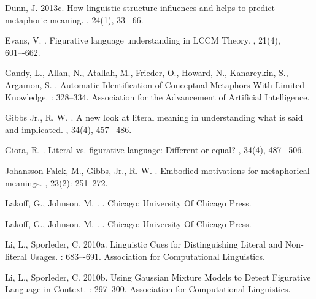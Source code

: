 \documentclass[11pt]{article}
\begin{document}
\begin{thebibliography}{}
Dunn, J. 
\newblock 2013c.
\newblock How linguistic structure influences and helps to predict metaphoric meaning.
, 24(1), 33–-66.

Evans, V.
.
\newblock Figurative language understanding in LCCM Theory.
, 21(4), 601–-662.

Gandy, L., Allan, N., Atallah, M., Frieder, O., Howard, N., Kanareykin, S., Argamon, S. 
.
\newblock Automatic Identification of Conceptual Metaphors With Limited Knowledge.
: 328--334. Association for the Advancement of Artificial Intelligence. 

Gibbs Jr., R. W. 
.
\newblock A new look at literal meaning in understanding what is said and implicated.
, 34(4), 457-–486.

Giora, R. 
.
\newblock Literal vs. figurative language: Different or equal?
, 34(4), 487-–506.

Johansson Falck, M., Gibbs, Jr., R. W. 
.
\newblock Embodied motivations for metaphorical meanings.
, 23(2): 251--272.

Lakoff, G., Johnson, M. 
.
. 
\newblock Chicago: University Of Chicago Press.

Lakoff, G., Johnson, M. 
.
. 
\newblock Chicago: University Of Chicago Press.

Li, L., Sporleder, C. 
\newblock 2010a.
\newblock Linguistic Cues for Distinguishing Literal and Non-literal Usages.
: 683–-691. Association for Computational Linguistics.

Li, L., Sporleder, C. 
\newblock 2010b.
\newblock Using Gaussian Mixture Models to Detect Figurative Language in Context.
: 297--300. Association for Computational Linguistics.


\end{thebibliography}
\end{document}
